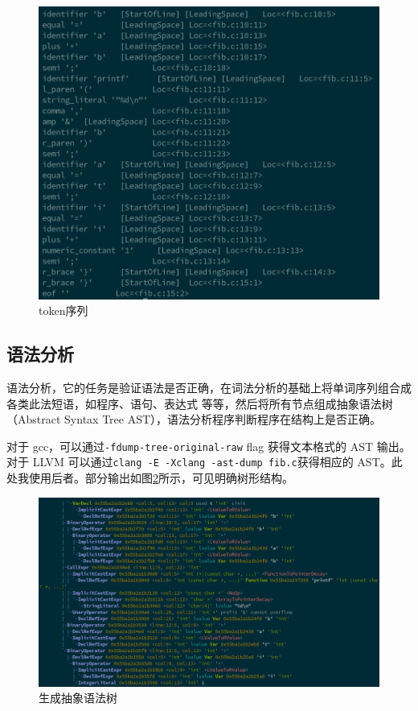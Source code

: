 \documentclass[UTF8,a4paper,10pt]{ctexart}
\begin{document}
\begin{figure}[H]
  \centering
  \includegraphics[width=\textwidth]{figure/token.png}
  \caption{token序列}
  \label{pic:1}
\end{figure}

\subsection{语法分析}
语法分析，它的任务是验证语法是否正确，在词法分析的基础上将单词序列组合成各类此法短语，如程序、语句、表达式 等等，然后将所有节点组成抽象语法树（Abstract Syntax Tree AST），语法分析程序判断程序在结构上是否正确。

对于 gcc，可以通过\verb|-fdump-tree-original-raw| flag 获得文本格式的 AST 输出。对于 LLVM 可以通过\verb|clang -E -Xclang -ast-dump fib.c|获得相应的 AST。此处我使用后者。部分输出如图\ref{pic:2}所示，可见明确树形结构。

\begin{figure}[H]
  \centering
  \includegraphics[width=\textwidth]{figure/AST.png}
  \caption{生成抽象语法树}
  \label{pic:2}
\end{figure}
\end{document}
